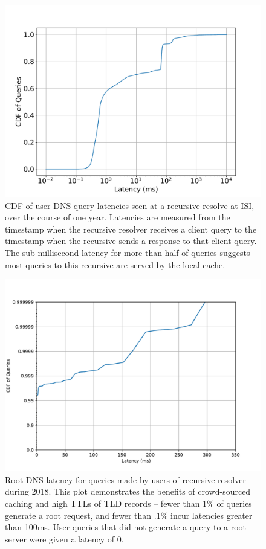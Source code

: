 \documentclass[sigconf,letterpaper,nonacm,10pt,anonymous]{acmart}
\begin{document}
\begin{figure}
    \centering
    \includegraphics[width=\linewidth]{figures/all_dns_latencies_isi.pdf}
    \caption{CDF of user DNS query latencies seen at a recursive resolve at ISI, over the course of one year. Latencies are measured from the timestamp when the recursive resolver receives a client query to the timestamp when the recursive sends a response to that client query. The sub-millisecond latency for more than half of queries suggests most queries to this recursive are served by the local cache. }
    \label{fig:all_dns_latencies_isi}
\end{figure}

\begin{figure}
    \centering
    \includegraphics[width=\linewidth]{figures/isi_root_dns_latency.pdf}
    \caption{Root DNS latency for queries made by users of \ISItwo recursive resolver during 2018. This plot demonstrates the benefits of crowd-sourced caching and high TTLs of TLD records -- fewer than 1\% of queries generate a root request, and fewer than .1\% incur latencies greater than 100ms. User queries that did not generate a query to a root server were given a latency of 0. }
    \label{fig:isi_root_dns_latency}
\end{figure}
\end{document}
